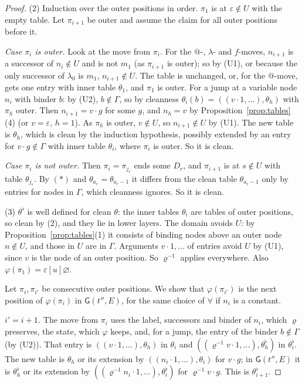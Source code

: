 \documentclass[11pt]{article}
\newcommand{\Gm}{\mathsf{G}}
\newcommand{\suc}[2]{#1{\cdot}#2}
\theoremstyle{plain}
\theoremstyle{definition}
\theoremstyle{remark}
\begin{document}
\begin{proof}
(2) Induction over the outer positions in order.  $\pi_1$ is at
$\varepsilon\notin U$ with the empty table.  Let $\pi_{i+1}$ be outer and
assume the claim for all outer positions before it.

\emph{Case $\pi_i$ is outer.}  Look at the move from $\pi_i$.  For the
$@$-, $\lambda$- and $f$-moves, $n_{i+1}$ is a successor of
$n_i\notin U$ and is not $m_1$ (as $\pi_{i+1}$ is outer); so by (U1),
or because the only successor of $\lambda_0$ is $m_1$, $n_{i+1}\notin
U$.  The table is unchanged, or, for the $@$-move, gets one entry with
inner table $\theta_1$, and $\pi_1$ is outer.  For a jump at a variable
node $n_i$ with binder $b$: by (U2), $b\notin\Gamma$, so by cleanness
$\theta_i(b)=((\suc v1,\dots),\theta_h)$ with $\pi_h$ outer.  Then
$n_{i+1}=\suc vg$ for some $g$, and $n_h=v$ by
Proposition~\ref{prop:tables}(4) (or $v=\varepsilon$, $h=1$).  As $\pi_h$
is outer, $v\notin U$, so $n_{i+1}\notin U$ by (U1).  The new table is
$\theta_h$, which is clean by the induction hypothesis, possibly extended
by an entry for $\suc vg\notin\Gamma$ with inner table $\theta_i$, where
$\pi_i$ is outer.  So it is clean.

\emph{Case $\pi_i$ is not outer.}  Then $\pi_i=\pi_{j_r}$ ends some
$D_r$, and $\pi_{i+1}$ is at $s\notin U$ with table $\theta_{j_r}$.  By
$(*)$ and $\theta_{a_r}=\theta_{a_r-1}$ it differs from the clean table
$\theta_{a_r-1}$ only by entries for nodes in $\Gamma$, which cleanness
ignores.  So it is clean.

(3) $\theta^\flat$ is well defined for clean $\theta$: the inner tables
$\theta_i$ are tables of outer positions, so clean by (2), and they lie
in lower layers.  The domain avoids $U$: by Proposition~\ref{prop:tables}(1)
it consists of binding nodes above an outer node $n\notin U$, and those
in $U$ are in $\Gamma$.  Arguments $\suc v1,\dots$ of entries avoid $U$
by (U1), since $v$ is the node of an outer position.  So $\varrho^{-1}$
applies everywhere.  Also $\varphi(\pi_1)=\varepsilon[u]\varnothing$.

Let $\pi_i,\pi_{i'}$ be consecutive outer positions.  We show that
$\varphi(\pi_{i'})$ is the next position of $\varphi(\pi_i)$ in
$\Gm(t'',E)$, for the same choice of $\forall$ if $n_i$ is a constant.

\emph{$i'=i+1$.}  The move from $\pi_i$ uses the label, successors and
binder of $n_i$, which $\varrho$ preserves, the state, which $\varphi$
keeps, and, for a jump, the entry of the binder $b\notin\Gamma$ (by (U2)).
That entry is $((\suc v1,\dots),\theta_h)$ in $\theta_i$ and
$((\varrho^{-1}\suc v1,\dots),\theta_h^\flat)$ in $\theta_i^\flat$.  The
new table is $\theta_h$ or its extension by
$((\suc{n_i}1,\dots),\theta_i)$ for $\suc vg$; in $\Gm(t'',E)$ it is
$\theta_h^\flat$ or its extension by
$((\varrho^{-1}\suc{n_i}1,\dots),\theta_i^\flat)$ for
$\varrho^{-1}\suc vg$.  This is $\theta_{i+1}^\flat$.


\end{proof}
\end{document}
